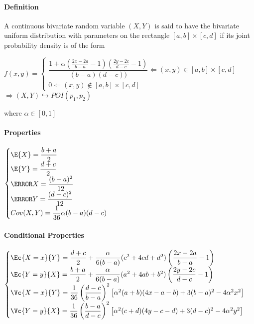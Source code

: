 \paragraph{Definition}
A continuous bivariate random variable $(X, Y )$ is said to have
the bivariate uniform distribution with parameters on the rectangle $[a,b]\times[c,d]$ if its joint probability density is of the
form
\begin{center}
	$f(x,y)=
	\begin{cases}	
		\dfrac{1+\alpha\left( \frac{2x-2a}{b-a}-1 \right)\left( \frac{2y-2c}{d-c}-1 \right)}{(b-a)(d-c))}\Leftarrow (x,y)\in [a,b]\times[c,d]\\
		0\Leftarrow (x,y)\not\in [a,b]\times[c,d] 
	\end{cases}$	
	$\Rightarrow \left( X,Y \right)\hookrightarrow POI(p_{1},p_{2})
	$
\end{center}
where $\alpha\in [0,1]$
\paragraph{Properties}
\begin{center}
	$
	\begin{cases}
		\E{X}=\dfrac{b+a}{2}\\
		\E{Y}=\dfrac{d+c}{2}\\
		\V{X}=\dfrac{(b-a)^{2}}{12}\\
		\V{Y}=\dfrac{(d-c)^{2}}{12}\\
		Cov(X,Y)=\dfrac{1}{36}\alpha(b-a)(d-c)
	\end{cases}
	$
\end{center}
\paragraph{Conditional Properties}
\begin{center}
	$
	\begin{cases}
		\Ec{X=x}{Y}=\dfrac{d+c}{2}+\dfrac{\alpha}{6(b-a)}(c^{2}+4cd+d^{2})\left( \dfrac{2x-2a}{b-a}-1 \right)\\
		\Ec{Y=y}{X}=\dfrac{b+a}{2}+\dfrac{\alpha}{6(b-a)}(a^{2}+4ab+b^{2})\left( \dfrac{2y-2c}{d-c}-1 \right)\\
		\Vc{X=x}{Y}=\dfrac{1}{36}\left( \dfrac{d-c}{b-a} \right)^{2}\left[ \alpha^{2}(a+b)(4x-a-b)+3(b-a)^{2}-4\alpha^{2}x^{2} \right]\\
		\Vc{Y=y}{X}=\dfrac{1}{36}\left( \dfrac{b-a}{d-c} \right)^{2}\left[ \alpha^{2}(c+d)(4y-c-d)+3(d-c)^{2}-4\alpha^{2}y^{2} \right]
	\end{cases}
	$
\end{center}
